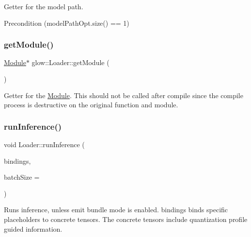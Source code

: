 Getter for the model path. \begin{DoxyPrecond}{Precondition}
(model\+Path\+Opt.\+size() == 1) 
\end{DoxyPrecond}
\mbox{\label{classglow_1_1_loader_a24825fa4a696f20bc4e2eb90ac840f16}} 
\subsubsection{\texorpdfstring{get\+Module()}{getModule()}}
{\footnotesize\ttfamily \hyperlink{classglow_1_1_module}{Module}$\ast$ glow\+::\+Loader\+::get\+Module (\begin{DoxyParamCaption}{ }\end{DoxyParamCaption})\hspace{0.3cm}{\ttfamily [inline]}}

Getter for the \hyperlink{classglow_1_1_module}{Module}. This should not be called after compile since the compile process is destructive on the original function and module. \mbox{\label{classglow_1_1_loader_aa0768ad9d8b71e237706a674b25d4376}} 
\subsubsection{\texorpdfstring{run\+Inference()}{runInference()}\hspace{0.1cm}{\footnotesize\ttfamily [1/2]}}
{\footnotesize\ttfamily void Loader\+::run\+Inference (\begin{DoxyParamCaption}\item[{\hyperlink{classglow_1_1_placeholder_bindings}{Placeholder\+Bindings} \&}]{bindings,  }\item[{size\+\_\+t}]{batch\+Size = {} }\end{DoxyParamCaption})}

Runs inference, unless emit bundle mode is enabled. {\ttfamily bindings} binds specific placeholders to concrete tensors. The concrete tensors include quantization profile guided information. \mbox{\label{classglow_1_1_loader_a0ccdbb5f29cb349efe8f3e34ff6a0fcd}} 
